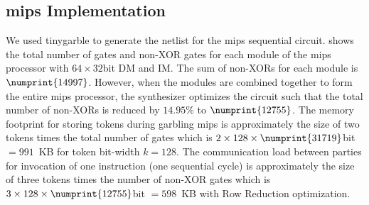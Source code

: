 \subsection{\gls{mips} Implementation}
We used \gls{tinygarble} to generate the netlist for the \gls{mips} sequential circuit.
 shows the total number of gates and non-XOR gates for each module of the \gls{mips} processor with $64\times32$bit DM and IM.
The sum of non-XORs for each module is $\numprint{14997}$.
However, when the modules are combined together to form the entire \gls{mips} processor, the synthesizer optimizes the circuit such that the total number of non-XORs is reduced by $14.95\%$ to $\numprint{12755}$.
The memory footprint for storing tokens during garbling \gls{mips} is approximately the size of two tokens times the total number of gates which is $2 \times 128 \times \numprint{31719}$bit $=991$~KB for token bit-width $k=128$.
The communication load between parties for invocation of one instruction (one sequential cycle) is approximately the size of three tokens times the number of non-XOR gates which is $3\times 128 \times \numprint{12755}$bit $=598$~KB with Row Reduction optimization.

